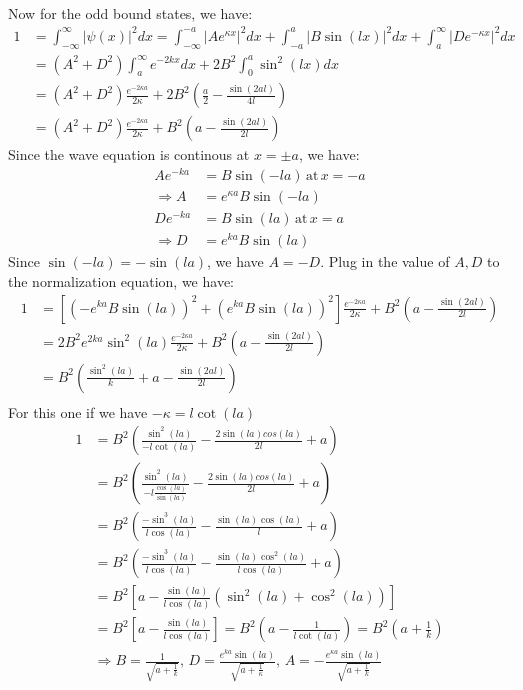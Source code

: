 \documentclass{article}
\begin{document}
\\
Now for the odd bound states, we have:
\begin{align*}
    1 &= \int_{-\infty}^{\infty} |\psi(x)|^2 dx = \int_{-\infty}^{-a} |Ae^{\kappa x}|^2 dx + \int_{-a}^{a} |B \sin(l x)|^2 dx + \int_{a}^{\infty} |De^{-\kappa x}|^2 dx \\
    &= (A^2 + D^2)\int_{a}^{\infty} e^{-2kx} dx  + 2 B^2 \int_{0}^{a} \sin^2(lx) dx \\
    &= (A^2 + D^2)\frac{e^{-2\kappa a}}{2\kappa} +2 B^2 \left(\frac{a}{2} - \frac{\sin(2al)}{4l}\right) \\
    &= (A^2 + D^2)\frac{e^{-2\kappa a}}{2\kappa} + B^2 \left(a - \frac{\sin(2al)}{2l}\right)
\end{align*}
Since the wave equation is continous at \(x = \pm a\), we have:
\begin{align*}
    Ae^{-ka} &= B \sin(-la) \, \text{at} \, x = -a \\
    \Rightarrow A &= e^{\kappa a} B \sin(-la) \\
    De^{-ka} &= B \sin(la) \, \text{at} \, x = a \\
    \Rightarrow D &= e^{ka} B \sin(la)
\end{align*}
Since \(\sin(-la) = -\sin(la)\), we have \(A = -D\). Plug in the value of \(A, D\) to the normalization equation, we have:
\begin{align*}
    1 &= \left[(-e^{ka} B \sin(la))^2 + (e^{ka} B \sin(la))^2\right] \frac{e^{-2\kappa a}}{2\kappa} + B^2 \left(a - \frac{\sin(2al)}{2l}\right) \\
    &= 2 B^2 e^{2ka} \sin^2(la) \frac{e^{-2\kappa a}}{2\kappa} + B^2 \left(a - \frac{\sin(2al)}{2l}\right) \\
    &= B^2 \left(\frac{\sin^2(la)}{k} + a - \frac{\sin(2al)}{2l}\right) \\
\end{align*}
For this one if we have \(-\kappa = l\cot(la)\)
\begin{align*}
    1 &= B^2 \left(\frac{\sin^2(la)}{-l\cot(la)} - \frac{2\sin(la)cos(la)}{2l}+a\right) \\
    &= B^2 \left(\frac{\sin^2(la)}{-l\frac{\cos(la)}{\sin(la)}} - \frac{2\sin(la)cos(la)}{2l}+a\right) \\
    &= B^2 \left(\frac{-\sin^3(la)}{l\cos(la)} - \frac{\sin(la)\cos(la)}{l} + a\right) \\
    &= B^2 \left(\frac{-\sin^3(la)}{l\cos(la)} - \frac{\sin(la)\cos^2(la)}{l\cos(la)} + a\right) \\
    &= B^2 \left[a - \frac{\sin(la)}{l\cos(la)}\left(\sin^2(la) + \cos^2(la)\right)\right] \\
    &= B^2 \left[a - \frac{\sin(la)}{l\cos(la)}\right] = B^2 \left(a - \frac{1}{l\cot(la)}\right) = B^2\left(a + \frac{1}{k}\right)\\
    &\Rightarrow B = \frac{1}{\sqrt{a+\frac{1}{k}}}, \, D = \frac{e^{ka} \sin(la)}{\sqrt{a + \frac{1}{\kappa}}}, \, A = -\frac{e^{\kappa a} \sin(la)}{\sqrt{a + \frac{1}{k}}}
\end{align*}
\end{document}
